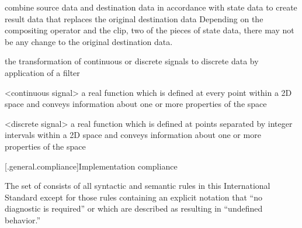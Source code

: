 combine source data and destination data in accordance with state data to 
create result data that replaces the original destination data
\enternote
Depending on the compositing operator and the clip, two of the pieces of state 
data, there may not be any change to the original destination data. 
\exitnote

%
the transformation of continuous or discrete signals to discrete 
data by application of a filter

<continuous signal> a real function which is defined at every point within a 
2D space and conveys information about one or more properties of the space

<discrete signal> a real function which is defined at points separated by 
integer intervals within a 2D space and conveys information about one or more 
properties of the space




[\iotwod.general.compliance]{Implementation compliance}

\pnum
{}%
%
The set of
consists of all syntactic and semantic rules in this International
Standard except for those rules containing an explicit notation that
``no diagnostic is required'' or which are described as resulting in
``undefined behavior.''

